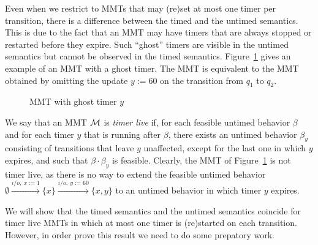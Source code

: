 Even when we restrict to MMTs that may (re)set at most one timer per transition, there is a difference
between the timed and the untimed semantics.
This is due to the fact that an MMT may have timers that are always stopped or restarted before
they expire. Such ``ghost'' timers are visible in the untimed semantics but cannot be observed in the timed semantics.
\iflong
Figure~\ref{fig:ghosttimers} gives an example of an MMT with a ghost timer. The MMT is equivalent to the MMT obtained by 
omitting the update $y :=60$ on the transition from $q_1$ to $q_2$.
\begin{figure}
\begin{center}
\caption{MMT with ghost timer $y$}
\label{fig:ghosttimers}
\end{center}
\end{figure}
\fi
%
We say that an MMT ${\cal M}$ is \emph{timer live} if, for each feasible untimed behavior $\beta$ and for each timer $y$ that is running after $\beta$, there exists an untimed behavior $\beta_y$ consisting of transitions that leave $y$ unaffected, except for the last one in which $y$ expires, and such that $\beta \cdot \beta_y$ is feasible.
\iflong
Clearly, the MMT of Figure~\ref{fig:ghosttimers} is not timer live, as there is no way to extend the feasible untimed
behavior $\emptyset \xrightarrow{i/o,~ x:=1 } \{ x\} \xrightarrow{i/o,~ y:=60 } \{ x, y\}$ to an untimed behavior in which
timer $y$ expires.
\fi

We will show that the timed semantics and the untimed semantics coincide for timer live MMTs in which at most one timer is (re)started on each transition. However, in order prove this result we need to do some prepatory work.

